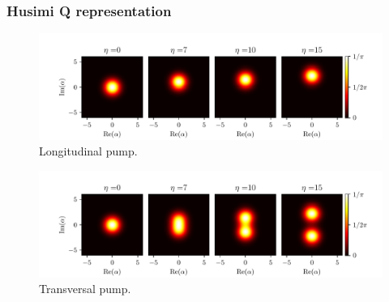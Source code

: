 \documentclass[pdflatex,compress]{beamer}
\begin{document}
\begin{frame}
\frametitle{Husimi Q representation}
\vspace{-1.5em}
\begin{figure}
\centering
\includegraphics[width=.9\textwidth]{images/qfunc_long.pdf}
\vspace*{-4mm}
\caption{Longitudinal pump.}
\end{figure}
\vspace{-2em}
\begin{figure}
\centering
\includegraphics[width=.9\textwidth]{images/qfunc_trans.pdf}
\vspace*{-4mm}
\caption{Transversal pump.}
\end{figure}
\end{frame}
\end{document}
